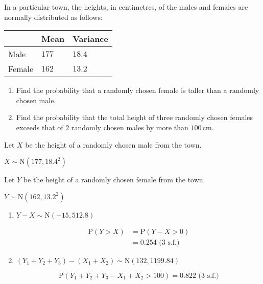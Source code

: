 \documentclass[11pt,a4paper]{book}
\begin{document}
\newpage

\begin{example}

In a particular town, the heights, in centimetres, of the males and
females are normally distributed as follows:
\begin{center}
\setlength{\extrarowheight}{2pt}%
\begin{tabular}{|>{\centering}p{4cm}|>{\centering}p{4cm}|>{\centering}p{4cm}|}
\hline 
 & Mean & Variance\tabularnewline
\hline 
Male & $177$ & $18.4$\tabularnewline
\hline 
Female & $162$ & $13.2$\tabularnewline
\hline 
\end{tabular}
\par\end{center}

\begin{enumerate}[label=(\alph*)] 

\item  Find the probability that a randomly chosen female is taller
than a randomly chosen male.

\item  Find the probability that the total height of three randomly
chosen females exceeds that of $2$ randomly chosen males by more
than $100\,\text{cm}$.

\end{enumerate}

\Solution

Let $X$ be the height of a randomly chosen male from the town.

$X\sim\text{N}\left(177,18.4^{2}\right)$

Let $Y$ be the height of a randomly chosen female from the town.

$Y\sim\text{N}\left(162,13.2^{2}\right)$

\begin{enumerate}[label=(\alph*)] 

\item  $Y-X\sim\text{N}\left(-15,512.8\right)$

\begin{align*}
\text{P}\left(Y>X\right) & =\text{P}\left(Y-X>0\right)\\
 & =0.254\text{ (3 s.f.)}
\end{align*}

\item  $\left(Y_{1}+Y_{2}+Y_{3}\right)-\left(X_{1}+X_{2}\right)\sim\text{N}\left(132,1199.84\right)$

\[
\text{P}\left(Y_{1}+Y_{2}+Y_{3}-X_{1}+X_{2}>100\right)=0.822\text{ (3 s.f.)}
\]

\end{enumerate}

\end{example}
\end{document}
